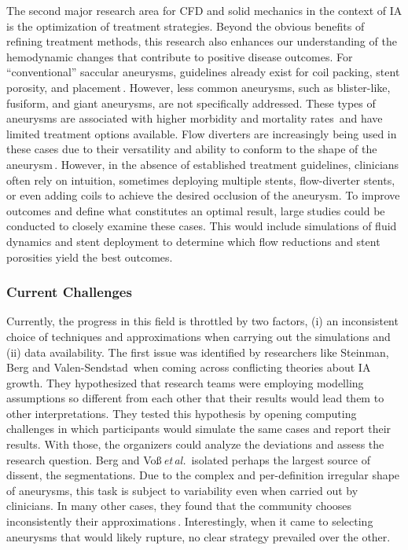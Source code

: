 The second major research area for CFD and solid mechanics in the context of IA is the optimization of treatment strategies. Beyond the obvious benefits of refining treatment methods, this research also enhances our understanding of the hemodynamic changes that contribute to positive disease outcomes. For ``conventional'' saccular aneurysms, guidelines already exist for coil packing, stent porosity, and placement\,\cite{Dandapat2021}. However, less common aneurysms, such as blister-like, fusiform, and giant aneurysms, are not specifically addressed. These types of aneurysms are associated with higher morbidity and mortality rates\,\cite{Peschillo2016, Kulcsar2011} and have limited treatment options available. Flow diverters are increasingly being used in these cases due to their versatility and ability to conform to the shape of the aneurysm\,\cite{Mokin2018}. However, in the absence of established treatment guidelines, clinicians often rely on intuition, sometimes deploying multiple stents, flow-diverter stents, or even adding coils to achieve the desired occlusion of the aneurysm. To improve outcomes and define what constitutes an optimal result, large studies could be conducted to closely examine these cases. This would include simulations of fluid dynamics and stent deployment to determine which flow reductions and stent porosities yield the best outcomes.

\subsubsection*{Current Challenges}
Currently, the progress in this field is throttled by two factors, (i) an inconsistent choice of techniques and approximations when carrying out the simulations and (ii) data availability. The first issue was identified by researchers like Steinman, Berg and Valen-Sendstad\,\cite{Berg2015, Steinman2013, Valen-Sendstad2018} when coming across conflicting theories about IA growth. They hypothesized that research teams were employing modelling assumptions so different from each other that their results would lead them to other interpretations. They tested this hypothesis by opening computing challenges in which participants would simulate the same cases and report their results. With those, the organizers could analyze the deviations and assess the research question. Berg and Vo\ss\,\textit{et\,al.}\,\cite{Berg2018, voss2019} isolated perhaps the largest source of dissent, the segmentations. Due to the complex and per-definition irregular shape of aneurysms, this task is subject to variability even when carried out by clinicians. In many other cases, they found that the community chooses inconsistently their approximations\,\cite{Berg2019}. Interestingly, when it came to selecting aneurysms that would likely rupture, no clear strategy prevailed over the other.

